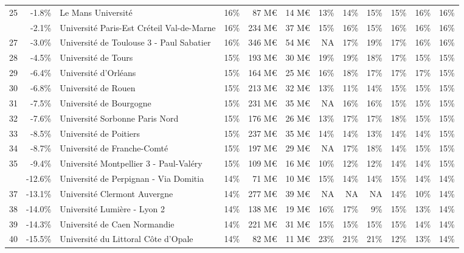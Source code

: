 \documentclass[11pt,french,landscape]{article}
\begin{document}
\begin{longtable}{rrlrrrrrrlrr}
\rowcolor{gray!6}  25 & -1.8\% & Le Mans Université & 16\% & 87 M€ & 14 M€ & 13\% & 14\% & 15\% & 15\% & 16\% & 16\%\\
\addlinespace
26 & -2.1\% & Université Paris-Est Créteil Val-de-Marne & 16\% & 234 M€ & 37 M€ & 15\% & 16\% & 15\% & 16\% & 16\% & 16\%\\
\rowcolor{gray!6}  27 & -3.0\% & Université de Toulouse 3 - Paul Sabatier & 16\% & 346 M€ & 54 M€ & NA & 17\% & 19\% & 17\% & 16\% & 16\%\\
28 & -4.5\% & Université de Tours & 15\% & 193 M€ & 30 M€ & 19\% & 19\% & 18\% & 17\% & 15\% & 15\%\\
\rowcolor{gray!6}  29 & -6.4\% & Université d'Orléans & 15\% & 164 M€ & 25 M€ & 16\% & 18\% & 17\% & 17\% & 17\% & 15\%\\
30 & -6.8\% & Université de Rouen & 15\% & 213 M€ & 32 M€ & 13\% & 11\% & 14\% & 15\% & 15\% & 15\%\\
\addlinespace
\rowcolor{gray!6}  31 & -7.5\% & Université de Bourgogne & 15\% & 231 M€ & 35 M€ & NA & 16\% & 16\% & 15\% & 15\% & 15\%\\
32 & -7.6\% & Université Sorbonne Paris Nord & 15\% & 176 M€ & 26 M€ & 13\% & 17\% & 17\% & 18\% & 15\% & 15\%\\
\rowcolor{gray!6}  33 & -8.5\% & Université de Poitiers & 15\% & 237 M€ & 35 M€ & 14\% & 14\% & 13\% & 14\% & 14\% & 15\%\\
34 & -8.7\% & Université de Franche-Comté & 15\% & 197 M€ & 29 M€ & NA & 17\% & 18\% & 14\% & 15\% & 15\%\\
\rowcolor{gray!6}  35 & -9.4\% & Université Montpellier 3 - Paul-Valéry & 15\% & 109 M€ & 16 M€ & 10\% & 12\% & 12\% & 14\% & 14\% & 15\%\\
\addlinespace
36 & -12.6\% & Université de Perpignan - Via Domitia & 14\% & 71 M€ & 10 M€ & 15\% & 14\% & 14\% & 15\% & 14\% & 14\%\\
\rowcolor{gray!6}  37 & -13.1\% & Université Clermont Auvergne & 14\% & 277 M€ & 39 M€ & NA & NA & NA & 14\% & 10\% & 14\%\\
38 & -14.0\% & Université Lumière - Lyon 2 & 14\% & 138 M€ & 19 M€ & 16\% & 17\% & 9\% & 15\% & 13\% & 14\%\\
\rowcolor{gray!6}  39 & -14.3\% & Université de Caen Normandie & 14\% & 221 M€ & 31 M€ & 15\% & 15\% & 15\% & 15\% & 14\% & 14\%\\
40 & -15.5\% & Université du Littoral Côte d'Opale & 14\% & 82 M€ & 11 M€ & 23\% & 21\% & 21\% & 12\% & 13\% & 14\%\\

\end{longtable}
\end{document}
